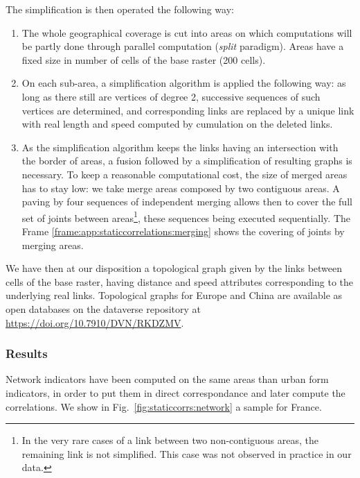 The simplification is then operated the following way:
\begin{enumerate}
\item The whole geographical coverage is cut into areas on which computations will be partly done through parallel computation (\emph{split} paradigm). Areas have a fixed size in number of cells of the base raster (200 cells).
\item On each sub-area, a simplification algorithm is applied the following way: as long as there still are vertices of degree 2, successive sequences of such vertices are determined, and corresponding links are replaced by a unique link with real length and speed computed by cumulation on the deleted links.
\item As the simplification algorithm keeps the links having an intersection with the border of areas, a fusion followed by a simplification of resulting graphs is necessary. To keep a reasonable computational cost, the size of merged areas has to stay low: we take merge areas composed by two contiguous areas. A paving by four sequences of independent merging allows then to cover the full set of joints between areas\footnote{In the very rare cases of a link between two non-contiguous areas, the remaining link is not simplified. This case was not observed in practice in our data.}, these sequences being executed sequentially. The Frame \ref{frame:app:staticcorrelations:merging} shows the covering of joints by merging areas.
\end{enumerate}

We have then at our disposition a topological graph given by the links between cells of the base raster, having distance and speed attributes corresponding to the underlying real links. Topological graphs for Europe and China are available as open databases on the dataverse repository at \url{https://doi.org/10.7910/DVN/RKDZMV}.





\subsubsection{Results}


Network indicators have been computed on the same areas than urban form indicators, in order to put them in direct correspondance and later compute the correlations. We show in Fig.~\ref{fig:staticcorrs:network} a sample for France.

